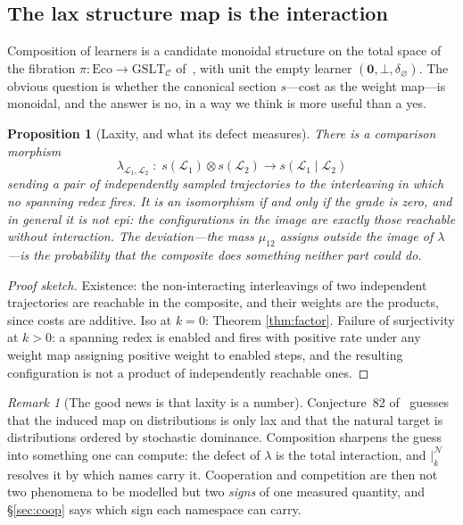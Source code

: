\documentclass[11pt,a4paper]{article}
\theoremstyle{plain}
\newtheorem{proposition}[theorem]{Proposition}
\theoremstyle{definition}
\theoremstyle{remark}
\newtheorem{remark}[theorem]{Remark}
\newcommand{\Lrn}{\mathcal{L}}
\newcommand{\Nsp}{\mathcal{N}}
\newcommand{\sep}[2]{\mathbin{\big|^{#1}_{#2}}}
\begin{document}
\subsection{The lax structure map is the interaction}

Composition of learners is a candidate monoidal structure on the total space of the fibration
$\pi : \mathrm{Eco} \to \mathrm{GSLT}_{\mathcal{C}}$ of~\cite[\S15]{scientist}, with unit the
empty learner $(\mathbf{0}, \bot, \delta_{\varnothing})$. The obvious question is whether the
canonical section $s$---cost as the weight map---is monoidal, and the answer is no, in a way we
think is more useful than a yes.

\begin{proposition}[Laxity, and what its defect measures]\label{prop:lax}
There is a comparison morphism
\[
  \lambda_{\Lrn_1,\Lrn_2} \;:\; s(\Lrn_1) \otimes s(\Lrn_2) \longrightarrow s(\Lrn_1 \mid \Lrn_2)
\]
sending a pair of independently sampled trajectories to the interleaving in which no spanning
redex fires. It is an isomorphism if and only if the grade is zero, and in general it is not
epi: the configurations in the image are exactly those reachable without interaction. The
deviation---the mass $\mu_{12}$ assigns outside the image of $\lambda$---is the probability that
the composite does something neither part could do.
\end{proposition}

\begin{proof}[Proof sketch]
Existence: the non-interacting interleavings of two independent trajectories are reachable in the
composite, and their weights are the products, since costs are additive. Iso at $k=0$: Theorem
\ref{thm:factor}. Failure of surjectivity at $k>0$: a spanning redex is enabled and fires with
positive rate under any weight map assigning positive weight to enabled steps, and the resulting
configuration is not a product of independently reachable ones.
\end{proof}

\begin{remark}[The good news is that laxity is a number]
Conjecture~82 of~\cite{scientist} guesses that the induced map on distributions is only lax and
that the natural target is distributions ordered by stochastic dominance. Composition sharpens
the guess into something one can compute: the defect of $\lambda$ is the total interaction, and
$\sep{\Nsp}{k}$ resolves it by which names carry it. Cooperation and competition are then not two
phenomena to be modelled but two \emph{signs} of one measured quantity, and \S\ref{sec:coop} says
which sign each namespace can carry.
\end{remark}
\end{document}
